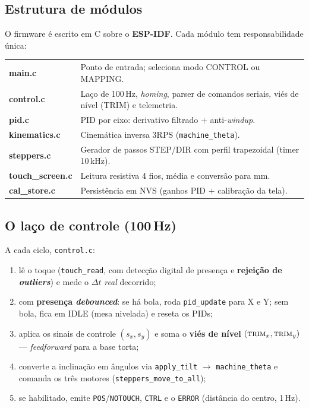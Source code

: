 \documentclass[11pt,a4paper,oneside]{article}
\newcommand{\rowstyle}{\rowcolor{rowgray}}
\begin{document}
\subsection{Estrutura de módulos}

O firmware é escrito em C sobre o \textbf{ESP-IDF}. Cada módulo tem
responsabilidade única:

\begin{center}
\small
\renewcommand{\arraystretch}{1.25}
\begin{tabularx}{\textwidth}{>{\ttfamily\bfseries\color{primary}}l >{\RaggedRight\arraybackslash}X}
\toprule
main.c & Ponto de entrada; seleciona modo CONTROL ou MAPPING. \\
\rowstyle control.c & Laço de 100\,Hz, \emph{homing}, parser de comandos seriais, viés de nível (TRIM) e telemetria. \\
pid.c & PID por eixo: derivativo filtrado + anti-\emph{windup}. \\
\rowstyle kinematics.c & Cinemática inversa 3RPS (\texttt{machine\_theta}). \\
steppers.c & Gerador de passos STEP/DIR com perfil trapezoidal (timer 10\,kHz). \\
\rowstyle touch\_screen.c & Leitura resistiva 4 fios, média e conversão para mm. \\
cal\_store.c & Persistência em NVS (ganhos PID + calibração da tela). \\
\bottomrule
\end{tabularx}
\end{center}

\subsection{O laço de controle (100\,Hz)}

A cada ciclo, \texttt{control.c}:

\begin{enumerate}
  \item lê o toque (\texttt{touch\_read}, com detecção digital de presença e
  \textbf{rejeição de \emph{outliers}}) e mede o $\Delta t$ \emph{real} decorrido;
  \item com \textbf{presença \emph{debounced}}: se há bola, roda
  \texttt{pid\_update} para X e Y; sem bola, fica em IDLE (mesa nivelada) e reseta
  os PIDs;
  \item aplica os sinais de controle $(s_x,s_y)$ e soma o \textbf{viés de nível}
  $(\textsc{trim}_x,\textsc{trim}_y)$ — \emph{feedforward} para a base torta;
  \item converte a inclinação em ângulos via \texttt{apply\_tilt} $\rightarrow$
  \texttt{machine\_theta} e comanda os três motores (\texttt{steppers\_move\_to\_all});
  \item se habilitado, emite \texttt{POS}/\texttt{NOTOUCH}, \texttt{CTRL} e o
  \texttt{ERROR} (distância do centro, 1\,Hz).
\end{enumerate}
\end{document}
